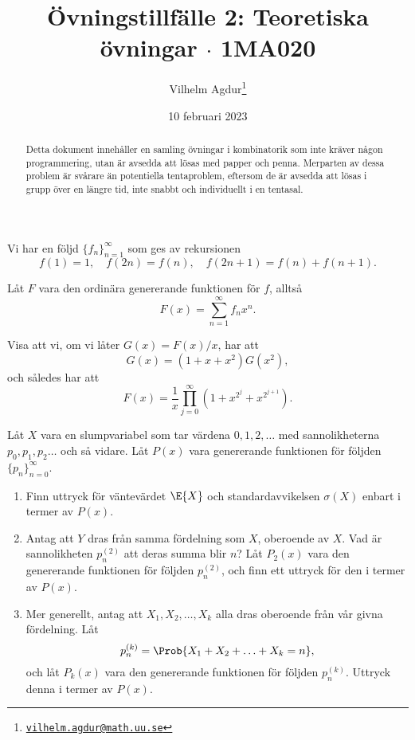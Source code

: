 \documentclass[nobib]{tufte-handout}
\title{Övningstillfälle 2: Teoretiska övningar $\cdot$ 1MA020}
\author[Vilhelm Agdur]{Vilhelm Agdur\thanks{\href{mailto:vilhelm.agdur@math.uu.se}{\nolinkurl{vilhelm.agdur@math.uu.se}}}}
\date{10 februari 2023}
\begin{document}
\maketitle%

\begin{abstract}
\noindent
Detta dokument innehåller en samling övningar i kombinatorik som inte kräver någon programmering, utan är avsedda att lösas med papper och penna. Merparten av dessa problem är svårare än potentiella tentaproblem, eftersom de är avsedda att lösas i grupp över en längre tid, inte snabbt och individuellt i en tentasal.
\end{abstract}

\begin{xca}
    Vi har en följd $\{f_n\}_{n=1}^\infty$ som ges av rekursionen
    $$f(1) = 1,\quad f(2n) = f(n),\quad f(2n + 1) = f(n) + f(n + 1).$$

    Låt $F$ vara den ordinära genererande funktionen för $f$,
    alltså
    $$F(x) = \sum_{n=1}^{\infty} f_n x^n.$$
    
    Visa att vi, om vi låter $G(x) = F(x)/x$, har att
    $$G(x) = \left(1 + x + x^2\right)G(x^2),$$
    och således har att
    $$F(x) = \frac{1}{x}\prod_{j = 0}^{\infty} \left(1 + x^{2^j} + x^{2^{j+1}}\right).$$
\end{xca}

\begin{xca}
    Låt $X$ vara en slumpvariabel som tar värdena $0, 1, 2,\ldots$ med sannolikheterna $p_0, p_1, p_2\ldots$ och så vidare. Låt $P(x)$ vara genererande funktionen för följden $\{p_n\}_{n=0}^\infty$.

    \begin{enumerate}
        \item Finn uttryck för väntevärdet $\E{X}$ och standardavvikelsen $\sigma(X)$ enbart i termer av $P(x)$.
        \item Antag att $Y$ dras från samma fördelning som $X$, oberoende av $X$. Vad är sannolikheten $p_n^{(2)}$ att deras summa blir $n$? Låt $P_2(x)$ vara den genererande funktionen för följden $p_n^{(2)}$, och finn ett uttryck för den i termer av $P(x)$.
        \item Mer generellt, antag att $X_1, X_2, \ldots, X_k$ alla dras oberoende från vår givna fördelning. Låt
        $$p_n^{(k)} = \Prob{X_1 + X_2 + \ldots + X_k = n},$$
        och låt $P_k(x)$ vara den genererande funktionen för följden $p_n^{(k)}$. Uttryck denna i termer av $P(x)$.
    \end{enumerate}
\end{xca}
\end{document}
